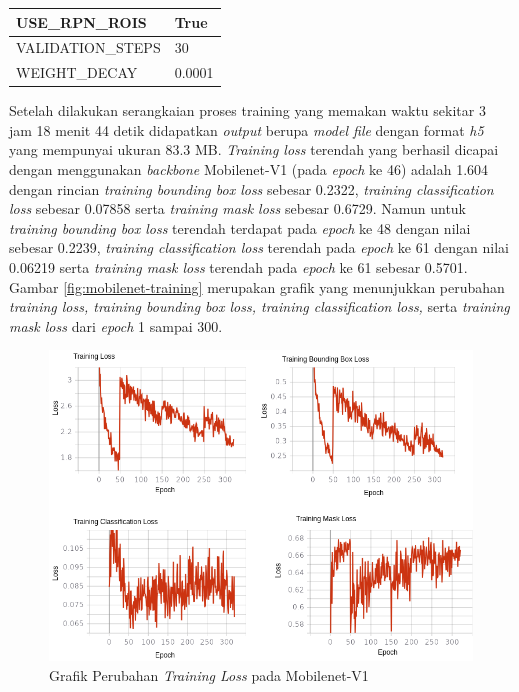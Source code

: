 \begin{longtable}[h]{|l|l|}
	USE\_RPN\_ROIS                  & True                                                                                                                                                                                   \\ \hline
	VALIDATION\_STEPS               & 30                                                                                                                                                                                     \\ \hline
	WEIGHT\_DECAY                   & 0.0001                                                                                                                                                                                 \\ \hline
\end{longtable}

Setelah dilakukan serangkaian proses training yang memakan waktu sekitar 3 jam 18 menit 44 detik didapatkan \textit{output} berupa \textit{model file}  dengan format \textit{h5} yang mempunyai ukuran 83.3 MB. \textit{Training loss} terendah yang berhasil dicapai dengan menggunakan \textit{backbone} Mobilenet-V1 (pada \textit{epoch} ke 46) adalah 1.604 dengan rincian \textit{training bounding box loss} sebesar 0.2322, \textit{training classification loss} sebesar 0.07858 serta \textit{training mask loss} sebesar 0.6729. Namun untuk \textit{training bounding box loss} terendah terdapat pada \textit{epoch} ke 48 dengan nilai sebesar 0.2239, \textit{training classification loss} terendah pada \textit{epoch} ke 61 dengan nilai 0.06219 serta \textit{training mask loss} terendah pada \textit{epoch} ke 61 sebesar 0.5701. Gambar \ref{fig:mobilenet-training} merupakan grafik yang menunjukkan perubahan \textit{training loss, training bounding box loss, training classification loss,} serta \textit{training mask loss} dari \textit{epoch} 1 sampai 300. 

\begin{figure}[h]
	\centering
	\includegraphics[scale=0.36]{gambar/mobilenetv1-train.png}
	\caption{Grafik Perubahan \textit{Training Loss} pada Mobilenet-V1}
	\label{fig:mobilenetv1-training}
\end{figure}



